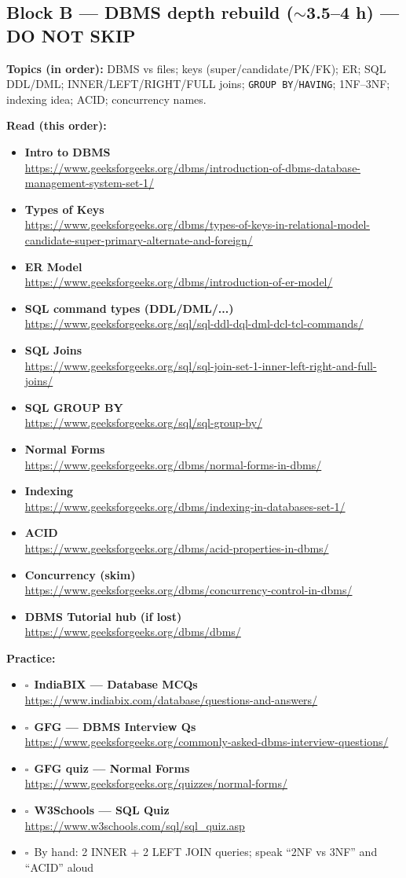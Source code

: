 \documentclass[a4paper,9pt]{extarticle}
\newcommand{\tick}{$\square$\ }
\newcommand{\Res}[2]{\textbf{#1}\\{\footnotesize\url{#2}}}
\begin{document}
\subsection{Block B --- DBMS depth rebuild ($\sim$3.5--4 h) --- DO NOT SKIP}
\noindent\textbf{Topics (in order):} DBMS vs files; keys (super/candidate/PK/FK); ER; SQL DDL/DML;
INNER/LEFT/RIGHT/FULL joins; \texttt{GROUP BY}/\texttt{HAVING}; 1NF--3NF; indexing idea; ACID; concurrency names.

\noindent\textbf{Read (this order):}
\begin{itemize}
  \item \Res{Intro to DBMS}{https://www.geeksforgeeks.org/dbms/introduction-of-dbms-database-management-system-set-1/}
  \item \Res{Types of Keys}{https://www.geeksforgeeks.org/dbms/types-of-keys-in-relational-model-candidate-super-primary-alternate-and-foreign/}
  \item \Res{ER Model}{https://www.geeksforgeeks.org/dbms/introduction-of-er-model/}
  \item \Res{SQL command types (DDL/DML/...)}{https://www.geeksforgeeks.org/sql/sql-ddl-dql-dml-dcl-tcl-commands/}
  \item \Res{SQL Joins}{https://www.geeksforgeeks.org/sql/sql-join-set-1-inner-left-right-and-full-joins/}
  \item \Res{SQL GROUP BY}{https://www.geeksforgeeks.org/sql/sql-group-by/}
  \item \Res{Normal Forms}{https://www.geeksforgeeks.org/dbms/normal-forms-in-dbms/}
  \item \Res{Indexing}{https://www.geeksforgeeks.org/dbms/indexing-in-databases-set-1/}
  \item \Res{ACID}{https://www.geeksforgeeks.org/dbms/acid-properties-in-dbms/}
  \item \Res{Concurrency (skim)}{https://www.geeksforgeeks.org/dbms/concurrency-control-in-dbms/}
  \item \Res{DBMS Tutorial hub (if lost)}{https://www.geeksforgeeks.org/dbms/dbms/}
\end{itemize}

\noindent\textbf{Practice:}
\begin{itemize}
  \item \tick \Res{IndiaBIX --- Database MCQs}{https://www.indiabix.com/database/questions-and-answers/}
  \item \tick \Res{GFG --- DBMS Interview Qs}{https://www.geeksforgeeks.org/commonly-asked-dbms-interview-questions/}
  \item \tick \Res{GFG quiz --- Normal Forms}{https://www.geeksforgeeks.org/quizzes/normal-forms/}
  \item \tick \Res{W3Schools --- SQL Quiz}{https://www.w3schools.com/sql/sql_quiz.asp}
  \item \tick By hand: 2 INNER + 2 LEFT JOIN queries; speak ``2NF vs 3NF'' and ``ACID'' aloud
\end{itemize}
\end{document}
